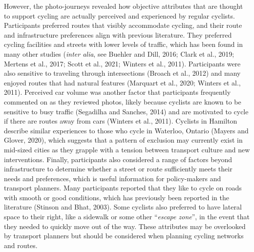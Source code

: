 \documentclass[]{elsarticle} %
\begin{document}
However, the photo-journeys revealed how objective attributes that are
thought to support cycling are actually perceived and experienced by
regular cyclists. Participants preferred routes that visibly accommodate
cycling, and their route and infrastructure preferences align with
previous literature. They preferred cycling facilities and streets with
lower levels of traffic, which has been found in many other studies
(\emph{inter alia}, see Buehler and Dill, 2016; Clark et al., 2019;
Mertens et al., 2017; Scott et al., 2021; Winters et al., 2011).
Participants were also sensitive to traveling through intersections
(Broach et al., 2012) and many enjoyed routes that had natural features
(Marquart et al., 2020; Winters et al., 2011). Perceived car volume was
another factor that participants frequently commented on as they
reviewed photos, likely because cyclists are known to be sensitive to
busy traffic (Segadilha and Sanches, 2014) and are motivated to cycle if
there are routes away from cars (Winters et al., 2011). Cyclists in
Hamilton describe similar experiences to those who cycle in Waterloo,
Ontario (Mayers and Glover, 2020), which suggests that a pattern of
exclusion may currently exist in mid-sized cities as they grapple with a
tension between transport culture and new interventions. Finally,
participants also considered a range of factors beyond infrastructure to
determine whether a street or route sufficiently meets their needs and
preferences, which is useful information for policy-makers and transport
planners. Many participants reported that they like to cycle on roads
with smooth or good conditions, which has previously been reported in
the literature (Stinson and Bhat, 2003). Some cyclists also preferred to
have lateral space to their right, like a sidewalk or some other
``\emph{escape zone}'', in the event that they needed to quickly move
out of the way. These attributes may be overlooked by transport planners
but should be considered when planning cycling networks and routes.
\end{document}
